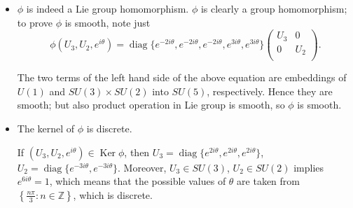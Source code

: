 \begin{itemize}
    \item $\phi$ is indeed a Lie group homomorphism. 
    $\phi$ is clearly a group homomorphism; to prove $\phi$
    is smooth, note just
    \begin{equation*}
        \phi(U_3,U_2,e^{i\theta})=
        \operatorname{diag}\{e^{-2i\theta},e^{-2i\theta},e^{-2i\theta},
        e^{3i\theta},e^{3i\theta}\}
        \left( 
            \begin{matrix}
	            U_3&		0\\
	            0&		U_2\\
            \end{matrix} 
        \right) .
    \end{equation*}

    The two terms of the left hand side of the above equation 
    are embeddings of $U(1)$ and $SU(3)\times SU(2)$ into $SU(5)$,
    respectively. Hence they are smooth; but also product operation
    in Lie group is smooth, so $\phi$ is smooth.

    \item The kernel of $\phi$ is discrete.

    If $(U_3,U_2,e^{i\theta})\in \operatorname{Ker}\phi$,
    then $U_3=\operatorname{diag}\{e^{2i\theta},e^{2i\theta},e^{2i\theta}\}$,
    $U_2=\operatorname{diag}\{e^{-3i\theta},e^{-3i\theta}\}$.
    Moreover, $U_3\in SU(3)$, $U_2\in SU(2)$ implies $e^{6i\theta}=1$, 
    which means that the possible values of $\theta$ are taken
    from $\left\{ \frac{n\pi}{3}: n\in \mathbb{Z} \right\}$,
    which is discrete.
\end{itemize}

